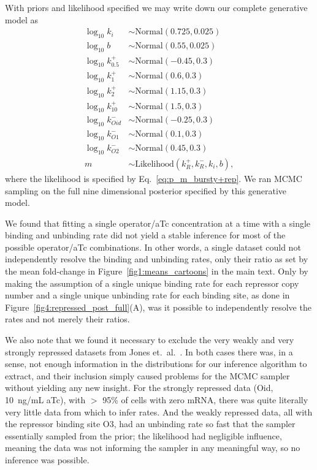With priors and likelihood specified we may write down our complete generative model as
\begin{equation}
\begin{split}
\log_{10}k_i &\sim \text{Normal}(0.725, 0.025)\\
\log_{10}b   &\sim \text{Normal}(0.55, 0.025)\\
\log_{10}k_{0.5}^+ &\sim \text{Normal}(-0.45, 0.3)\\
\log_{10}k_{1}^+   &\sim \text{Normal}(0.6, 0.3)\\
\log_{10}k_{2}^+   &\sim \text{Normal}(1.15, 0.3)\\
\log_{10}k_{10}^+  &\sim \text{Normal}(1.5, 0.3)\\
\log_{10}k_{Oid}^- &\sim \text{Normal}(-0.25, 0.3)\\
\log_{10}k_{O1}^-  &\sim \text{Normal}(0.1, 0.3)\\
\log_{10}k_{O2}^-  &\sim \text{Normal}(0.45, 0.3)\\
m &\sim \text{Likelihood}(k_R^+, k_R^-, k_i, b),
\end{split}
\end{equation}
where the likelihood is specified by Eq.~\ref{eq:p_m_bursty+rep}. We ran MCMC
sampling on the full nine dimensional posterior specified by this generative
model.

We found that fitting a single operator/aTc concentration at a time with a
single binding and unbinding rate did not yield a stable inference for most of
the possible operator/aTc combinations. In other words, a single dataset could
not independently resolve the binding and unbinding rates, only their ratio as
set by the mean fold-change in Figure~\ref{fig1:means_cartoons} in the main
text. Only by making the assumption of a single unique binding rate for each
repressor copy number and a single unique unbinding rate for each binding site,
as done in Figure~\ref{fig4:repressed_post_full}(A), was it possible to
independently resolve the rates and not merely their ratios.

We also note that we found it necessary to exclude the very weakly and very
strongly repressed datasets from Jones et.\ al.~\cite{Jones2014}. In both cases
there was, in a sense, not enough information in the distributions for our
inference algorithm to extract, and their inclusion simply caused problems for
the MCMC sampler without yielding any new insight. For the strongly repressed
data (Oid, 10~ng/mL aTc), with $>$ 95\% of cells with zero mRNA, there was quite
literally very little data from which to infer rates. And the weakly repressed
data, all with the repressor binding site O3, had an unbinding rate so fast that
the sampler essentially sampled from the prior; the likelihood had negligible
influence, meaning the data was not informing the sampler in any meaningful way,
so no inference was possible.

